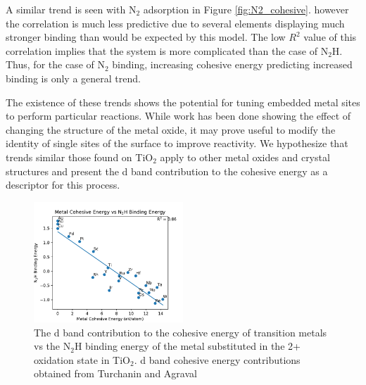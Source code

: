 \documentclass[catalysts,article,submit,moreauthors,pdftex,10pt,a4paper]{mdpi}
\theoremstyle{mdpi}
\newcounter{ex}
\newcounter{re}
\theoremstyle{mdpidefinition}
\begin{document}

A similar trend is seen with N$_2$ adsorption in Figure \ref{fig:N2_cohesive}. however the correlation is much less predictive due to several elements displaying much stronger binding than would be expected by this model. The low $R^2$ value of this correlation implies that the system is more complicated than the case of N$_2$H. Thus, for the case of N$_2$ binding, increasing cohesive energy predicting increased binding is only a general trend. 

The existence of these trends shows the potential for tuning embedded metal sites to perform particular reactions. While work has been done showing the effect of changing the structure of the metal oxide\cite{Back_2019, Hoskuldsson_2017}, it may prove useful to modify the identity of single sites of the surface to improve reactivity. We hypothesize that trends similar those found on TiO$_2$ apply to other metal oxides and crystal structures and present the d band contribution to the cohesive energy as a descriptor for this process.





\begin{figure}
    \centering
    \includegraphics[width=0.5\textwidth]{Images/cohesive_eng_vs_N2H.pdf}
    
    \caption{The d band contribution to the cohesive energy of transition metals vs the N$_2$H binding energy of the metal substituted in the 2+ oxidation state in TiO$_2$. d band cohesive energy contributions obtained from Turchanin and Agraval\cite{Turchanin_2008}}
    \label{fig:N2H_cohesive}
\end{figure}
\end{document}
